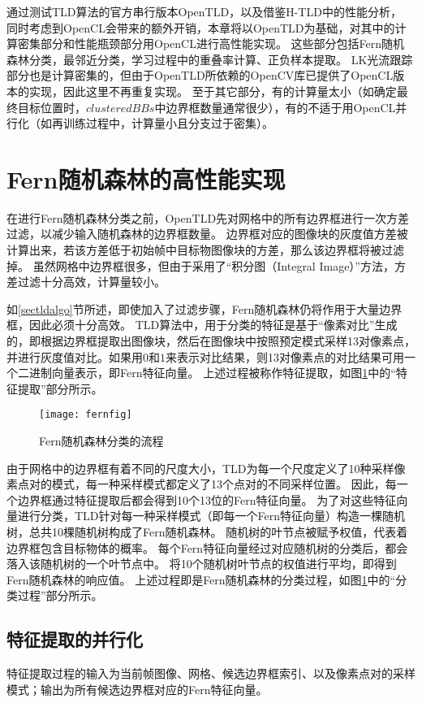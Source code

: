 通过测试TLD算法的官方串行版本OpenTLD，以及借鉴H-TLD中的性能分析，
同时考虑到OpenCL会带来的额外开销，本章将以OpenTLD为基础，对其中的计算密集部分和性能瓶颈部分用OpenCL进行高性能实现。
这些部分包括Fern随机森林分类，最邻近分类，学习过程中的重叠率计算、正负样本提取。
LK光流跟踪部分也是计算密集的，但由于OpenTLD所依赖的OpenCV库已提供了OpenCL版本的实现，因此这里不再重复实现。
至于其它部分，有的计算量太小（如确定最终目标位置时，$clusteredBBs$中边界框数量通常很少），有的不适于用OpenCL并行化（如再训练过程中，计算量小且分支过于密集）。

\section{Fern随机森林的高性能实现}
在进行Fern随机森林分类之前，OpenTLD先对网格中的所有边界框进行一次方差过滤，以减少输入随机森林的边界框数量。
边界框对应的图像块的灰度值方差被计算出来，若该方差低于初始帧中目标物图像块的方差，那么该边界框将被过滤掉。
虽然网格中边界框很多，但由于采用了``积分图（Integral Image）''方法，方差过滤十分高效，计算量较小。

如\ref{sectldalgo}节所述，即使加入了过滤步骤，Fern随机森林仍将作用于大量边界框，因此必须十分高效。
TLD算法中，用于分类的特征是基于``像素对比''生成的，即根据边界框提取出图像块，然后在图像块中按照预定模式采样13对像素点，并进行灰度值对比。如果用$0$和$1$来表示对比结果，则13对像素点的对比结果可用一个二进制向量表示，即Fern特征向量。
上述过程被称作特征提取，如图\ref{fernfig}中的``特征提取''部分所示。

\begin{figure}[htb]
  \centering
  \texttt{[image: fernfig]}
  \caption{Fern随机森林分类的流程}
  \label{fernfig}
\end{figure}

由于网格中的边界框有着不同的尺度大小，TLD为每一个尺度定义了10种采样像素点对的模式，每一种采样模式都定义了13个点对的不同采样位置。
因此，每一个边界框通过特征提取后都会得到10个13位的Fern特征向量。
为了对这些特征向量进行分类，TLD针对每一种采样模式（即每一个Fern特征向量）构造一棵随机树，总共10棵随机树构成了Fern随机森林。
随机树的叶节点被赋予权值，代表着边界框包含目标物体的概率。
每个Fern特征向量经过对应随机树的分类后，都会落入该随机树的一个叶节点中。
将10个随机树叶节点的权值进行平均，即得到Fern随机森林的响应值。
上述过程即是Fern随机森林的分类过程，如图\ref{fernfig}中的``分类过程''部分所示。

\subsection{特征提取的并行化}
\label{featureextsec}
特征提取过程的输入为当前帧图像、网格、候选边界框索引、以及像素点对的采样模式；输出为所有候选边界框对应的Fern特征向量。

